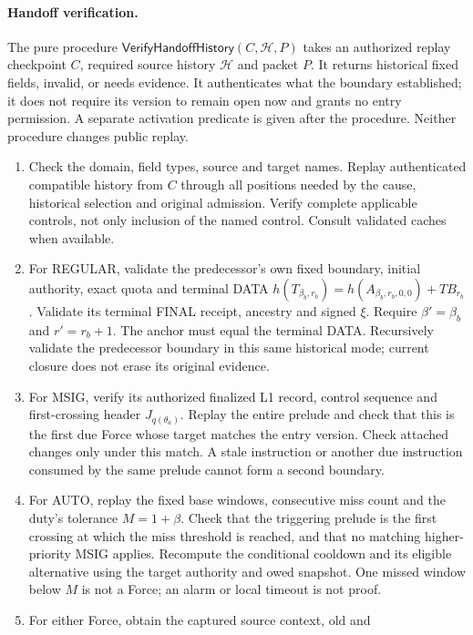 \documentclass[11pt,a4paper]{article}
\newcommand{\TB}{\mathit{TB}}
\newcommand{\tagg}[1]{\ensuremath{\mathsf{#1}}}
\begin{document}
\paragraph{Handoff verification.}
\label{sec:verify-handoff}
The pure procedure $\tagg{VerifyHandoffHistory}(C,\mathcal H,P)$ takes an
authorized replay checkpoint $C$, required source history $\mathcal H$
and packet $P$. It returns historical fixed fields, invalid, or needs
evidence. It authenticates what the boundary established; it does not
require its version to remain open now and grants no entry permission.
A separate activation predicate is given after the procedure. Neither
procedure changes public replay.
\begin{enumerate}[label=(\roman*),itemsep=2pt]
\item Check the domain, field types, source and target names. Replay
authenticated compatible history from $C$ through all positions
needed by the cause, historical selection and original admission.
Verify complete applicable controls, not only inclusion of the named
control. Consult validated caches when available.
\item For REGULAR, validate the predecessor's own fixed boundary,
initial authority, exact quota and terminal DATA
$h(T_{\beta_b,r_b})=h(A_{\beta_b,r_b,0,0})+\TB_{r_b}$.
Validate its terminal FINAL receipt, ancestry and signed $\xi$.
Require $\beta'=\beta_b$ and $r'=r_b+1$. The anchor must equal the
terminal DATA. Recursively validate the predecessor boundary in this same
historical mode; current closure does not erase its original evidence.
\item For MSIG, verify its authorized finalized L1 record, control
sequence and first-crossing header $J_{q(\theta_a)}$. Replay the
entire prelude and check that this is the first due Force whose target
matches the entry version. Check attached changes only under this
match. A stale instruction or another due instruction consumed by the
same prelude cannot form a second boundary.
\item For AUTO, replay the fixed base windows, consecutive miss count
and the duty's tolerance $M=1+\beta$. Check that the triggering prelude
is the first crossing at which the miss threshold is reached, and that
no matching higher-priority MSIG applies. Recompute the conditional
cooldown and its eligible alternative using the target authority and
owed snapshot. One missed window below $M$ is not a Force; an alarm or
local timeout is not proof.
\item For either Force, obtain the captured source context, old and

\end{enumerate}
\end{document}
